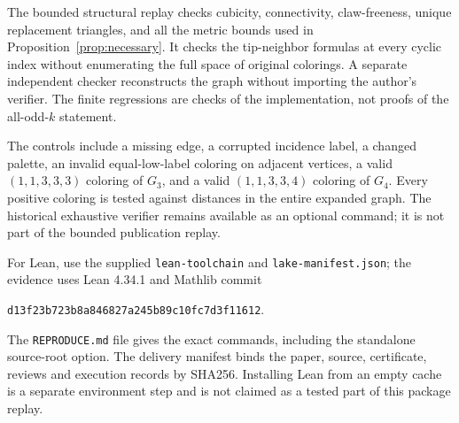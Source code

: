 \documentclass[11pt,a4paper]{article}
\theoremstyle{definition}
\theoremstyle{remark}
\newcommand{\palette}{(1,1,3,3,4)}
\newcommand{\weakpalette}{(1,1,3,3,3)}
\begin{document}
The bounded structural replay checks cubicity, connectivity,
claw-freeness, unique replacement triangles, and all the metric
bounds used in Proposition~\ref{prop:necessary}. It checks the
tip-neighbor formulas at every cyclic index without enumerating
the full space of original colorings. A separate independent checker
reconstructs the graph without importing the author's verifier.
The finite regressions are checks of the implementation, not proofs
of the all-odd-\(k\) statement.

The controls include a missing edge, a corrupted incidence label,
a changed palette, an invalid equal-low-label coloring on adjacent
vertices, a valid \(\weakpalette\) coloring of \(G_3\), and a valid
\(\palette\) coloring of \(G_4\). Every positive coloring is tested
against distances in the entire expanded graph. The historical
exhaustive verifier remains available as an optional command; it is
not part of the bounded publication replay.

For Lean, use the supplied \texttt{lean-toolchain} and
\texttt{lake-manifest.json}; the evidence uses Lean 4.34.1 and
Mathlib commit
\begin{center}\small\texttt{d13f23b723b8a846827a245b89c10fc7d3f11612}.\end{center}
The \texttt{REPRODUCE.md} file gives the exact commands, including
the standalone source-root option. The delivery manifest binds the
paper, source, certificate, reviews and execution records by SHA256.
Installing Lean from an empty cache is a separate environment step
and is not claimed as a tested part of this package replay.
\end{document}
